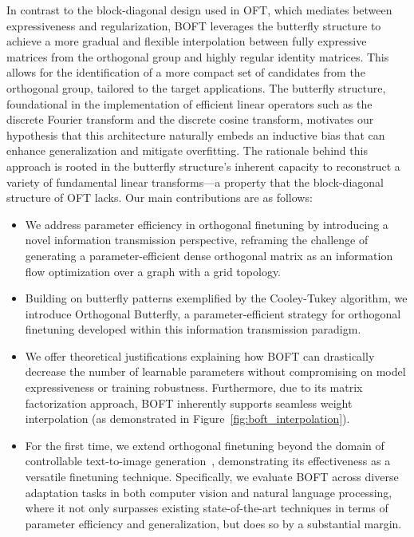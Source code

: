 In contrast to the block-diagonal design used in OFT, which mediates between expressiveness and regularization, BOFT leverages the butterfly structure to achieve a more gradual and flexible interpolation between fully expressive matrices from the orthogonal group and highly regular identity matrices. This allows for the identification of a more compact set of candidates from the orthogonal group, tailored to the target applications. The butterfly structure, foundational in the implementation of efficient linear operators such as the discrete Fourier transform and the discrete cosine transform, motivates our hypothesis that this architecture naturally embeds an inductive bias that can enhance generalization and mitigate overfitting. The rationale behind this approach is rooted in the butterfly structure’s inherent capacity to reconstruct a variety of fundamental linear transforms—a property that the block-diagonal structure of OFT lacks. Our main contributions are as follows:

\begin{itemize}[leftmargin=*,nosep]
    \item We address parameter efficiency in orthogonal finetuning by introducing a novel information transmission perspective, reframing the challenge of generating a parameter-efficient dense orthogonal matrix as an information flow optimization over a graph with a grid topology.
    \item Building on butterfly patterns exemplified by the Cooley-Tukey algorithm, we introduce Orthogonal Butterfly, a parameter-efficient strategy for orthogonal finetuning developed within this information transmission paradigm.
    \item We offer theoretical justifications explaining how BOFT can drastically decrease the number of learnable parameters without compromising on model expressiveness or training robustness. Furthermore, due to its matrix factorization approach, BOFT inherently supports seamless weight interpolation (as demonstrated in Figure~\ref{fig:boft_interpolation}).
    \item For the first time, we extend orthogonal finetuning beyond the domain of controllable text-to-image generation~\cite{qiu2023controlling}, demonstrating its effectiveness as a versatile finetuning technique. Specifically, we evaluate BOFT across diverse adaptation tasks in both computer vision and natural language processing, where it not only surpasses existing state-of-the-art techniques in terms of parameter efficiency and generalization, but does so by a substantial margin.
\end{itemize}


